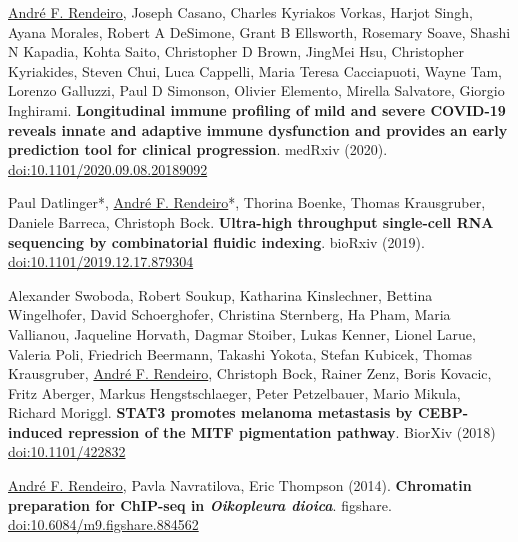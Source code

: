 \documentclass[11pt,a4paper,roman]{moderncv} %
\begin{document}
    
        \begin{etaremune}[leftmargin=1.0cm, itemindent=0pt, topsep=10pt, itemsep=2pt, partopsep=0pt, parsep=0pt]
        \item \underline{André F. Rendeiro}, Joseph Casano, Charles Kyriakos Vorkas, Harjot Singh, Ayana Morales, Robert A DeSimone, Grant B Ellsworth, Rosemary Soave, Shashi N Kapadia, Kohta Saito, Christopher D Brown, JingMei Hsu, Christopher Kyriakides, Steven Chui, Luca Cappelli, Maria Teresa Cacciapuoti, Wayne Tam, Lorenzo Galluzzi, Paul D Simonson, Olivier Elemento, Mirella Salvatore, Giorgio Inghirami. \textbf{Longitudinal immune profiling of mild and severe COVID-19 reveals innate and adaptive immune dysfunction and provides an early prediction tool for clinical progression}. medRxiv (2020). \href{https://dx.doi.org/10.1101/2020.09.08.20189092}{doi:10.1101/2020.09.08.20189092}

        \item Paul Datlinger*, \underline{André F. Rendeiro}*, Thorina Boenke, Thomas Krausgruber, Daniele Barreca, Christoph Bock. \textbf{Ultra-high throughput single-cell RNA sequencing by combinatorial fluidic indexing}. bioRxiv (2019). \href{https://dx.doi.org/10.1101/2019.12.17.879304}{doi:10.1101/2019.12.17.879304}
        \item Alexander Swoboda, Robert Soukup, Katharina Kinslechner, Bettina Wingelhofer, David Schoerghofer, Christina Sternberg, Ha Pham, Maria Vallianou, Jaqueline Horvath, Dagmar Stoiber, Lukas Kenner, Lionel Larue, Valeria Poli, Friedrich Beermann, Takashi Yokota, Stefan Kubicek, Thomas Krausgruber, \underline{André F. Rendeiro}, Christoph Bock, Rainer Zenz, Boris Kovacic, Fritz Aberger, Markus Hengstschlaeger, Peter Petzelbauer, Mario Mikula, Richard Moriggl. \textbf{STAT3 promotes melanoma metastasis by CEBP-induced repression of the MITF pigmentation pathway}. BiorXiv (2018) \href{https://dx.doi.org/ 10.1101/422832}{doi:10.1101/422832}
        \item \underline{André F. Rendeiro}, Pavla  Navratilova, Eric Thompson (2014). \textbf{Chromatin preparation for ChIP-seq in \textit{Oikopleura dioica}}. figshare. \href{https://doi.org/10.6084/m9.figshare.884562}{doi:10.6084/m9.figshare.884562}
        \end{etaremune}
\end{document}
